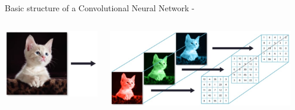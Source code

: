 \begin{frame}[t,allowframebreaks]{Basic structure of a Convolutional Neural Network -}
    \begin{columns}
        \begin{column}{0.22\textwidth}
            \vspace{0.0cm}
            \begin{center}
                \includegraphics[width=1.0\textwidth]
                    {./images/cnn/example_inputs/example_1_cat.png}\\
            \end{center}
        \end{column}
        \begin{column}{0.46\textwidth}
            \vspace{0.0cm}
            \begin{center}
                \includegraphics[width=1.0\textwidth]
                  {./images/cnn/example_inputs/example_1_cat_rgb.png}\\
            \end{center}      
        \end{column}
        \begin{column}{0.32\textwidth}
            \vspace{0.0cm}

\end{column}
\end{columns}
\end{frame}
